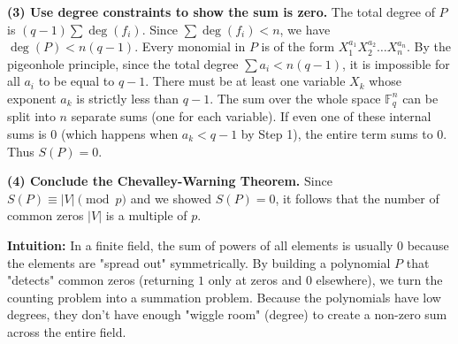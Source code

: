 \begin{solution}
\textbf{(3) Use degree constraints to show the sum is zero.}
The total degree of $P$ is $(q-1) \sum \deg(f_i)$. Since $\sum \deg(f_i) < n$, we have $\deg(P) < n(q-1)$.
Every monomial in $P$ is of the form $X_1^{a_1} X_2^{a_2} \dots X_n^{a_n}$.
By the pigeonhole principle, since the total degree $\sum a_i < n(q-1)$, it is impossible for all $a_i$ to be equal to $q-1$.
There must be at least one variable $X_k$ whose exponent $a_k$ is strictly less than $q-1$.
The sum over the whole space $\mathbb{F}_q^n$ can be split into $n$ separate sums (one for each variable).
If even one of these internal sums is $0$ (which happens when $a_k < q-1$ by Step 1), the entire term sums to $0$.
Thus $S(P) = 0$.

\textbf{(4) Conclude the Chevalley-Warning Theorem.}
Since $S(P) \equiv |V| \pmod p$ and we showed $S(P) = 0$, it follows that the number of common zeros $|V|$ is a multiple of $p$.

\textbf{Intuition:}
In a finite field, the sum of powers of all elements is usually $0$ because the elements are "spread out" symmetrically. By building a polynomial $P$ that "detects" common zeros (returning $1$ only at zeros and $0$ elsewhere), we turn the counting problem into a summation problem. Because the polynomials have low degrees, they don't have enough "wiggle room" (degree) to create a non-zero sum across the entire field.
\end{solution}

